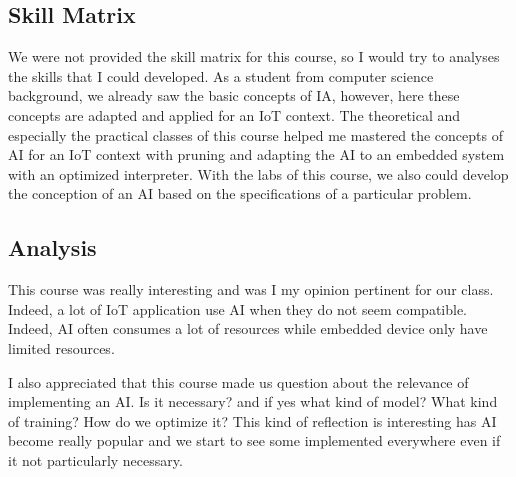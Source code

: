 \subsection{Skill Matrix}

We were not provided the skill matrix for this course, so I would try to analyses the skills that I could developed. As a student from computer science background, we already saw the basic concepts of IA, however, here these concepts are adapted and applied for an IoT context. The theoretical and especially the practical classes of this course helped me mastered the concepts of AI for an IoT context with pruning and adapting the AI to an embedded system with an optimized interpreter. With the labs of this course, we also could develop the conception of an AI based on the specifications of a particular problem. 

\subsection{Analysis}

This course was really interesting and was I my opinion pertinent for our class. Indeed, a lot of IoT application use AI when they do not seem compatible. Indeed, AI often consumes a lot of resources while embedded device only have limited resources.

I also appreciated that this course made us question about the relevance of implementing an AI. Is it necessary? and if yes what kind of model? What kind of training? How do we optimize it? This kind of reflection is interesting has AI become really popular and we start to see some implemented everywhere even if it not particularly necessary.